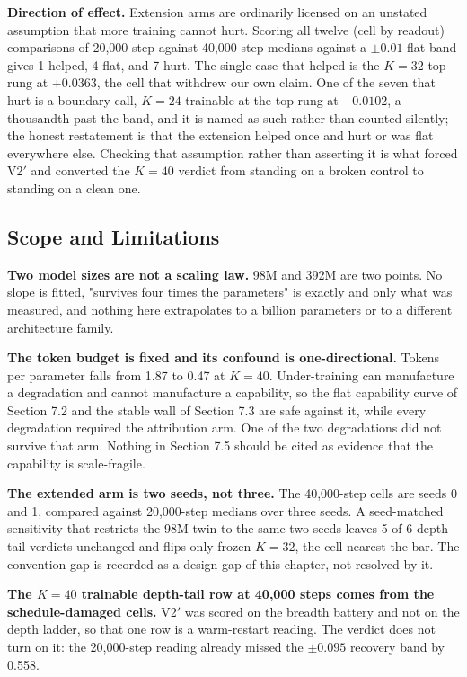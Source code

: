\textbf{Direction of effect.} Extension arms are ordinarily licensed on an
unstated assumption that more training cannot hurt. Scoring all twelve
(cell by readout) comparisons of 20,000-step against 40,000-step medians
against a $\pm 0.01$ flat band gives 1 helped, 4 flat, and 7 hurt. The
single case that helped is the $K{=}32$ top rung at $+0.0363$, the cell
that withdrew our own claim. One of the seven that hurt is a boundary
call, $K{=}24$ trainable at the top rung at $-0.0102$, a thousandth past
the band, and it is named as such rather than counted silently; the
honest restatement is that the extension helped once and hurt or was
flat everywhere else. Checking that assumption rather than asserting it
is what forced V2$'$ and converted the $K{=}40$ verdict from standing on
a broken control to standing on a clean one.

\subsection{Scope and Limitations}

\textbf{Two model sizes are not a scaling law.} 98M and 392M are two points.
No slope is fitted, "survives four times the parameters" is exactly and
only what was measured, and nothing here extrapolates to a billion
parameters or to a different architecture family.

\textbf{The token budget is fixed and its confound is one-directional.}
Tokens per parameter falls from 1.87 to 0.47 at $K{=}40$. Under-training
can manufacture a degradation and cannot manufacture a capability, so
the flat capability curve of Section 7.2 and the stable wall of Section
7.3 are safe against it, while every degradation required the
attribution arm. One of the two degradations did not survive that arm.
Nothing in Section 7.5 should be cited as evidence that the capability
is scale-fragile.

\textbf{The extended arm is two seeds, not three.} The 40,000-step cells are
seeds 0 and 1, compared against 20,000-step medians over three seeds. A
seed-matched sensitivity that restricts the 98M twin to the same two
seeds leaves 5 of 6 depth-tail verdicts unchanged and flips only frozen
$K{=}32$, the cell nearest the bar. The convention gap is recorded as a
design gap of this chapter, not resolved by it.

\textbf{The $K{=}40$ trainable depth-tail row at 40,000 steps comes from the
schedule-damaged cells.} V2$'$ was scored on the breadth battery and
not on the depth ladder, so that one row is a warm-restart reading. The
verdict does not turn on it: the 20,000-step reading already missed the
$\pm 0.095$ recovery band by 0.558.

